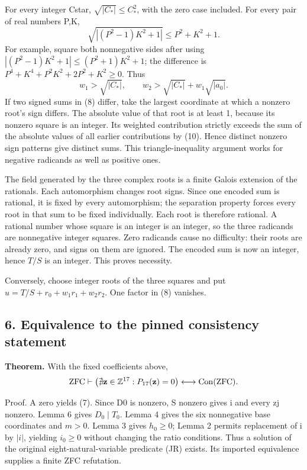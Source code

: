 For every integer Cstar, \(\sqrt{|C_\ast|}\le C_\ast^2\), with the zero
case included. For every pair of real numbers P,K, \[
 \sqrt{|(P^2-1)K^2+1|}\le P^2+K^2+1.
 \tag{9}
\] For example, square both nonnegative sides after using
\(|(P^2-1)K^2+1|\le(P^2+1)K^2+1\); the difference is
\(P^4+K^4+P^2K^2+2P^2+K^2\ge0\). Thus \[
 w_1>\sqrt{|C_\ast|},\qquad
 w_2>\sqrt{|C_\ast|}+w_1\sqrt{|a_0|}.
 \tag{10}
\] If two signed sums in (8) differ, take the largest coordinate at
which a nonzero root's sign differs. The absolute value of that root is
at least 1, because its nonzero square is an integer. Its weighted
contribution strictly exceeds the sum of the absolute values of all
earlier contributions by (10). Hence distinct nonzero sign patterns give
distinct sums. This triangle-inequality argument works for negative
radicands as well as positive ones.

The field generated by the three complex roots is a finite Galois
extension of the rationals. Each automorphism changes root signs. Since
one encoded sum is rational, it is fixed by every automorphism; the
separation property forces every root in that sum to be fixed
individually. Each root is therefore rational. A rational number whose
square is an integer is an integer, so the three radicands are
nonnegative integer squares. Zero radicands cause no difficulty: their
roots are already zero, and signs on them are ignored. The encoded sum
is now an integer, hence \(T/S\) is an integer. This proves necessity.

Conversely, choose integer roots of the three squares and put
\(u=T/S+r_0+w_1r_1+w_2r_2\). One factor in (8) vanishes.

\hypertarget{equivalence-to-the-pinned-consistency-statement}{%
\subsection{6. Equivalence to the pinned consistency
statement}\label{equivalence-to-the-pinned-consistency-statement}}

\textbf{Theorem.} With the fixed coefficients above, \[
 \mathrm{ZFC}\vdash
 \big(\nexists{\bf z}\in\mathbb Z^{17}:P_{17}({\bf z})=0\big)
 \longleftrightarrow\operatorname{Con}(\mathrm{ZFC}).
\]

Proof. A zero yields (7). Since D0 is nonzero, S nonzero gives i and
every zj nonzero. Lemma 6 gives \(D_0\mid T_0\). Lemma 4 gives the six
nonnegative base coordinates and \(m>0\). Lemma 3 gives \(h_0\ge0\);
Lemma 2 permits replacement of i by \(|i|\), yielding \(i_0\ge0\)
without changing the ratio conditions. Thus a solution of the original
eight-natural-variable predicate (JR) exists. Its imported equivalence
supplies a finite ZFC refutation.

